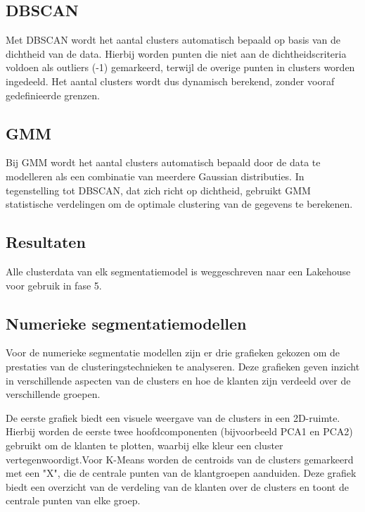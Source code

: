 \newpage

\subsection*{DBSCAN}

Met DBSCAN wordt het aantal clusters automatisch bepaald op basis van de dichtheid van de data. Hierbij worden punten die niet aan de dichtheidscriteria voldoen als outliers (-1) gemarkeerd, terwijl de overige punten in clusters worden ingedeeld. Het aantal clusters wordt dus dynamisch berekend, zonder vooraf gedefinieerde grenzen.

\subsection*{GMM}

Bij GMM wordt het aantal clusters automatisch bepaald door de data te modelleren als een combinatie van meerdere Gaussian distributies. In tegenstelling tot DBSCAN, dat zich richt op dichtheid, gebruikt GMM statistische verdelingen om de optimale clustering van de gegevens te berekenen.

\newpage

\subsection{Resultaten}

Alle clusterdata van elk segmentatiemodel is weggeschreven naar een Lakehouse voor gebruik in fase 5.

\subsection*{Numerieke segmentatiemodellen}

Voor de numerieke segmentatie modellen zijn er drie grafieken gekozen om de prestaties van de clusteringstechnieken te analyseren. Deze grafieken geven inzicht in verschillende aspecten van de clusters en hoe de klanten zijn verdeeld over de verschillende groepen.

\vspace{1em}

De eerste grafiek biedt een visuele weergave van de clusters in een 2D-ruimte. Hierbij worden de eerste twee hoofdcomponenten (bijvoorbeeld PCA1 en PCA2) gebruikt om de klanten te plotten, waarbij elke kleur een cluster vertegenwoordigt.Voor K-Means worden de centroids van de clusters gemarkeerd met een "X", die de centrale punten van de klantgroepen aanduiden. Deze grafiek biedt een overzicht van de verdeling van de klanten over de clusters en toont de centrale punten van elke groep.


